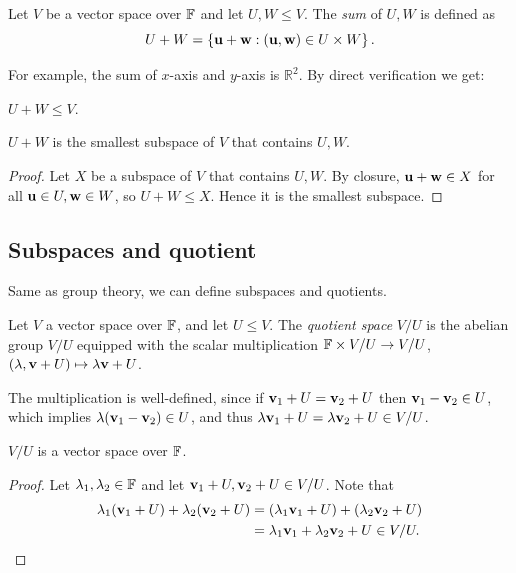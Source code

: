 \documentclass[a4paper,11pt]{article}
\begin{document}
\begin{definition}
    Let $V$ be a vector space over ${\mathbb{F}}$ and let $U,W\le V$. The \textit{sum} of $U,W$ is defined as 
    \[
        U+W  =\left\{ {\bf u}+{\bf w}: ({\bf u},{\bf w})\in U\times W \right\}.
    \] 
\end{definition}
For example, the sum of $x$-axis and $y$-axis is $ \mathbb{R}^{2} $. By direct verification we get:

\begin{proposition}
    $U+W\le V$.
\end{proposition}
\begin{proposition}
    $U+W$ is the smallest subspace of $V$ that contains $U,W$.
\end{proposition}
\begin{proof}
    Let $X$ be a subspace of $V$ that contains $U,W$. By closure, $ {\bf u}+{\bf w}\in X $ for all $ {\bf u}\in U,{\bf w}\in W $, so $ U+W\le X $. Hence it is the smallest subspace.
\end{proof}
\subsection{Subspaces and quotient}
Same as group theory, we can define subspaces and quotients. 
\begin{definition}[Quotient]
    Let $V$ a vector space over ${\mathbb{F}}$, and let $U \leq V$. The \emph{quotient space} $V/U$ is the abelian group $V/U$ equipped with the scalar multiplication ${\mathbb{F}} \times V/U \rightarrow V/U$, $(\lambda, {\bf v} + U) \mapsto \lambda {\bf v} + U$.
\end{definition}
The multiplication is well-defined, since if $ {\bf v}_1+U={\bf v}_2+U $ then $ {\bf v}_1-{\bf v}_2\in U $, which implies $ \lambda({\bf v}_1-{\bf v}_2) \in U$, and thus $ \lambda{\bf v}_1+U=\lambda{\bf v}_2+U\in V/U $.
\begin{proposition}
    $V/U$ is a vector space over ${\mathbb{F}}$.
\end{proposition}
\begin{proof}
    Let $ \lambda_1,\lambda_2\in {\mathbb{F}} $ and let $ {\bf v}_1+U,{\bf v}_2+U\in V/U $. Note that 
    \begin{align*}
        \lambda_1({\bf v}_1+U)+\lambda_2({\bf v}_2+U) &= (\lambda_1{\bf v}_1+U)+(\lambda_2{\bf v}_2+U)\\ 
        &= \lambda_1{\bf v}_1+\lambda_2{\bf v}_2+U\in V/U.\qedhere
    \end{align*}
\end{proof}
\end{document}
